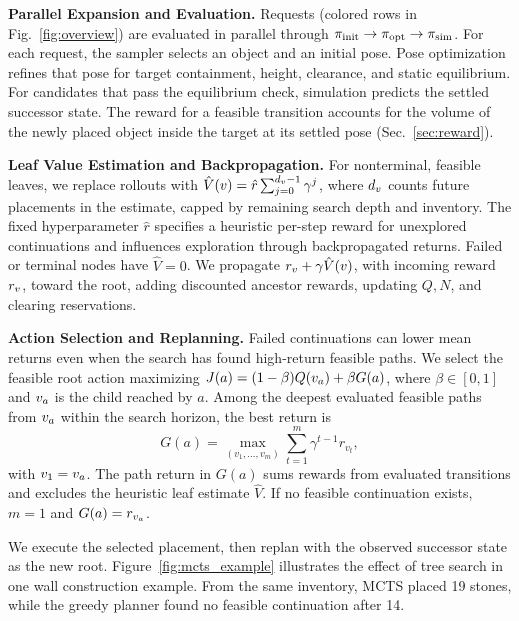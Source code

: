 \noindent \textbf{Parallel Expansion and Evaluation.}
Requests (colored rows in Fig.~\ref{fig:overview}) are evaluated in parallel through $\pi_\text{init}\to\pi_\text{opt}\to\pi_\text{sim}$.
For each request, the sampler selects an object and an initial pose. Pose optimization refines that pose for target containment, height, clearance, and static equilibrium. For candidates that pass the equilibrium check, simulation predicts the settled successor state. The reward for a feasible transition accounts for the volume of the newly placed object inside the target at its settled pose (Sec.~\ref{sec:reward}).

\noindent \textbf{Leaf Value Estimation and Backpropagation.}
For nonterminal, feasible leaves, we replace rollouts with $\hat V(v)=\hat r\sum_{j=0}^{d_{v}-1}\gamma^j$, where $d_{v}$ counts future placements in the estimate, capped by remaining search depth and inventory.
The fixed hyperparameter $\hat r$ specifies a heuristic per-step reward for unexplored continuations and influences exploration through backpropagated returns.
Failed or terminal nodes have $\hat V=0$.
We propagate $r_{v}+\gamma\hat V(v)$, with incoming reward $r_{v}$, toward the root, adding discounted ancestor rewards, updating $Q,N$, and clearing reservations.

\noindent \textbf{Action Selection and Replanning.}
Failed continuations can lower mean returns even when the search has found high-return feasible paths.
We select the feasible root action maximizing $J(a)=(1-\beta)Q(v_a)+\beta G(a)$, where $\beta\in[0,1]$ and $v_a$ is the child reached by $a$. Among the deepest evaluated feasible paths from $v_a$ within the search horizon, the best return is
\begin{equation*}
 G(a)=\max_{(v_1,\ldots,v_m)}\sum_{t=1}^{m}\gamma^{t-1}r_{v_t},
\end{equation*}
with $v_1=v_a$.
The path return in $G(a)$ sums rewards from evaluated transitions and excludes the heuristic leaf estimate $\hat V$. If no feasible continuation exists, $m=1$ and $G(a)=r_{v_a}$.

We execute the selected placement, then replan with the observed successor state as the new root.
Figure~\ref{fig:mcts_example} illustrates the effect of tree search in one wall construction example. From the same inventory, MCTS placed 19 stones, while the greedy planner found no feasible continuation after 14.




